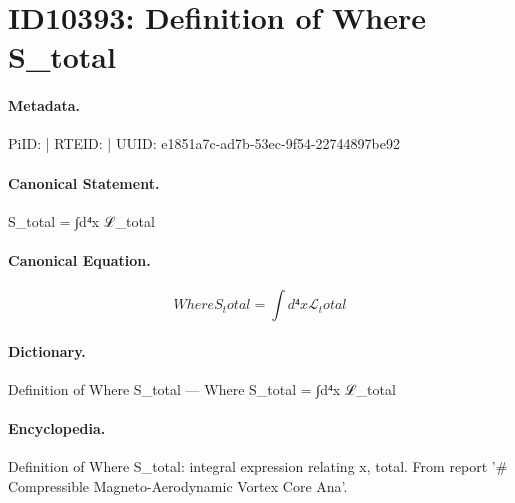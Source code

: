 \section*{ID10393: Definition of Where S\_total}
\paragraph{Metadata.}
PiID:  | RTEID:  | UUID: e1851a7c-ad7b-53ec-9f54-22744897be92

\paragraph{Canonical Statement.}
S\_total = ∫d⁴x ℒ\_total

\paragraph{Canonical Equation.}
\[
Where S_total = ∫d⁴x ℒ_total
\]

\paragraph{Dictionary.}
Definition of Where S\_total — Where S\_total = ∫d⁴x ℒ\_total

\paragraph{Encyclopedia.}
Definition of Where S\_total: integral expression relating x, total. From report '\# Compressible Magneto-Aerodynamic Vortex Core Ana'.

